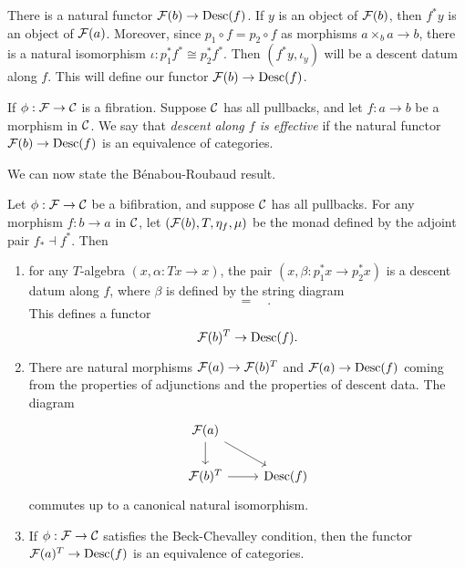 \documentclass{amsart}
\begin{document}
\begin{example}
    There is a natural functor $\mathcal F(b)\to \operatorname{Desc}(f)$.
    If $y$ is an object of $\mathcal F(b)$,
        then $f^\ast y$ is an object of $\mathcal F(a)$.
    Moreover, since $p_1\circ f = p_2\circ f$ as morphisms $a\times_b a\to b$,
        there is a natural isomorphism $\iota:p_1^\ast f^\ast \cong p_2^\ast f^\ast$.
    Then $(f^\ast y,\iota_y)$ will be a descent datum along $f$.
    This will define our functor $\mathcal F(b)\to \operatorname{Desc}(f)$.
\end{example}
\begin{definition}
    If $\phi:\mathcal F\to \mathcal C$ is a fibration.
    Suppose $\mathcal C$ has all pullbacks, and let $f:a\to b$ be a morphism in $\mathcal C$.
    We say that \emph{descent along $f$ is effective}
        if the natural functor $\mathcal F(b)\to \operatorname{Desc}(f)$ is an equivalence of categories.
\end{definition}
We can now state the B\'enabou-Roubaud result.
\begin{theorem}\label{benabou-roubaud}
    Let $\phi:\mathcal F\to \mathcal C$ be a bifibration,
        and suppose $\mathcal C$ has all pullbacks.
    For any morphism $f:b\to a$ in $\mathcal C$,
        let $(\mathcal F(b),T,\eta_f,\mu)$
        be the monad
        defined by the adjoint pair $f_\ast \dashv f^\ast$.
    Then 
    \begin{enumerate}
    \item for any $T$-algebra $(x,\alpha:Tx\to x)$, the pair $(x,\beta:p_1^\ast x\to p_2^\ast x)$
        is a descent datum along $f$, where $\beta$ is defined by the string diagram
    \[
        
        \quad=\quad
        
        .
    \]
    This defines a functor
    \[  
        \mathcal F(b)^T \to \operatorname{Desc}(f).
    \] \label{benabou-roubaud-functor-def}
    \item There are natural morphisms $\mathcal F(a)\to \mathcal F(b)^T$ and $\mathcal F(a)\to \operatorname{Desc}(f)$
            coming from the properties of adjunctions and the properties of descent data.
        The diagram
    \[
        \begin{tikzcd}
            \mc F(a) \arrow[rd]  \arrow[d] & \\
            \mc F(b)^T \arrow[r] & \Desc(f)
        \end{tikzcd}
    \]
        commutes up to a canonical natural isomorphism.\label{benabou-roubaud-commute}

    \item If $\phi:\mathcal F\to \mathcal C$ satisfies the Beck-Chevalley condition, then 
            the functor
            $\mathcal F(a)^T\to \operatorname{Desc}(f)$ is an equivalence of categories.
\end{enumerate}
\end{theorem}
\end{document}
